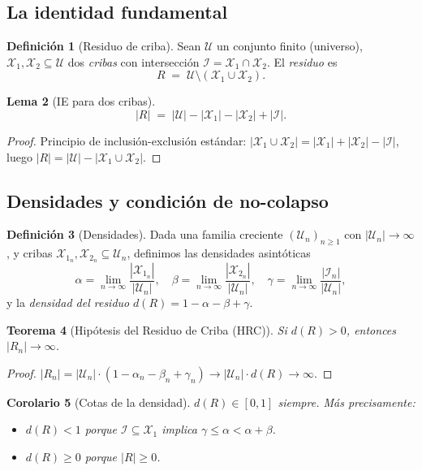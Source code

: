 \documentclass[11pt,a4paper]{article}
\newtheorem{theorem}{Teorema}
\newtheorem{lemma}[theorem]{Lema}
\newtheorem{corollary}[theorem]{Corolario}
\theoremstyle{definition}
\newtheorem{definition}[theorem]{Definición}
\newcommand{\cA}{\mathcal{X}_1}       %
\newcommand{\cB}{\mathcal{X}_2}       %
\newcommand{\cU}{\mathcal{U}}         %
\begin{document}
\subsection{La identidad fundamental}

\begin{definition}[Residuo de criba]
Sean $\cU$ un conjunto finito (universo), $\cA, \cB \subseteq \cU$ dos
\emph{cribas} con intersección $\mathcal{I} = \cA \cap \cB$.  El
\emph{residuo} es
\[
    R \;=\; \cU \setminus (\cA \cup \cB).
\]
\end{definition}

\begin{lemma}[IE para dos cribas]\label{lem:ie}
\[
    |R| \;=\; |\cU| - |\cA| - |\cB| + |\mathcal{I}|.
\]
\end{lemma}
\begin{proof}
Principio de inclusión-exclusión estándar: $|\cA\cup\cB|=|\cA|+|\cB|-|\mathcal{I}|$,
luego $|R|=|\cU|-|\cA\cup\cB|$.
\end{proof}

\subsection{Densidades y condición de no-colapso}

\begin{definition}[Densidades]
Dada una familia creciente $(\cU_n)_{n\geq1}$ con $|\cU_n|\to\infty$, y
cribas $\cA_n,\cB_n\subseteq\cU_n$, definimos las densidades asintóticas
\[
    \alpha = \lim_{n\to\infty}\frac{|\cA_n|}{|\cU_n|}, \quad
    \beta  = \lim_{n\to\infty}\frac{|\cB_n|}{|\cU_n|}, \quad
    \gamma = \lim_{n\to\infty}\frac{|\mathcal{I}_n|}{|\cU_n|},
\]
y la \emph{densidad del residuo} $d(R) = 1-\alpha-\beta+\gamma$.
\end{definition}

\begin{theorem}[Hipótesis del Residuo de Criba (HRC)]\label{thm:hrc}
Si $d(R)>0$, entonces $|R_n|\to\infty$.
\end{theorem}
\begin{proof}
$|R_n| = |\cU_n|\cdot(1-\alpha_n-\beta_n+\gamma_n) \to |\cU_n|\cdot d(R) \to \infty$.
\end{proof}

\begin{corollary}[Cotas de la densidad]\label{cor:cotas}
$d(R) \in [0,1]$ siempre.  Más precisamente:
\begin{itemize}
    \item $d(R)<1$ porque $\mathcal{I}\subseteq\cA$ implica $\gamma\leq\alpha<\alpha+\beta$.
    \item $d(R)\geq0$ porque $|R|\geq0$.
\end{itemize}
\end{corollary}
\end{document}
